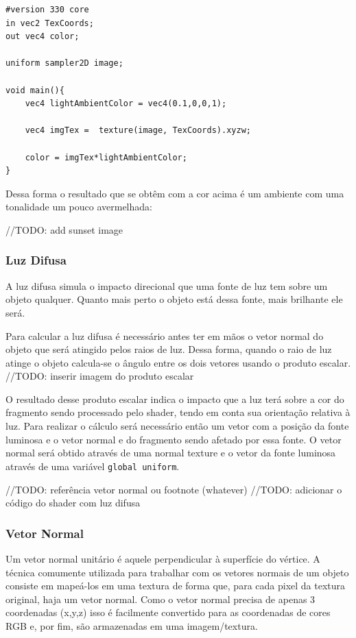 \documentclass[12pt, 
openright, 
oneside, 
a4paper,    
brazil]{facom-ufu-abntex2}
\begin{document}
\begin{lstlisting}[caption=Fragment Shader com luz ambiente]
#version 330 core
in vec2 TexCoords;
out vec4 color;

uniform sampler2D image;

void main(){
	vec4 lightAmbientColor = vec4(0.1,0,0,1);
	
	vec4 imgTex =  texture(image, TexCoords).xyzw;
	
	color = imgTex*lightAmbientColor;
}
\end{lstlisting}

Dessa forma o resultado que se obtêm com a cor acima é um ambiente com uma tonalidade um pouco avermelhada:

//TODO: add sunset image


\subsubsection{Luz Difusa}
A luz difusa simula o impacto direcional que uma fonte de luz tem sobre um objeto qualquer. Quanto mais perto o objeto está dessa fonte, mais brilhante ele será.

Para calcular a luz difusa é necessário antes ter em mãos o vetor normal do objeto que será atingido pelos raios de luz. Dessa forma, quando o raio de luz atinge o objeto calcula-se o ângulo entre os dois vetores usando o produto escalar.
//TODO: inserir imagem do produto escalar 

O resultado desse produto escalar indica o impacto que a luz terá sobre a cor do fragmento sendo processado pelo shader, tendo em conta sua orientação relativa à luz. Para realizar o cálculo será necessário  então um vetor com a posição da fonte luminosa e o vetor normal e do fragmento sendo afetado por essa fonte.
O vetor normal será obtido através de uma normal texture e o vetor da fonte luminosa através de uma variável \texttt{global uniform}.  

//TODO: referência vetor normal ou footnote (whatever)
//TODO: adicionar o código do shader com luz difusa

\subsubsection{Vetor Normal}

Um vetor normal unitário é aquele perpendicular à superfície do vértice. A técnica comumente utilizada para trabalhar com os vetores normais de um objeto consiste em mapeá-los em uma textura de forma que, para cada pixel da textura original, haja um vetor normal. Como o vetor normal precisa de apenas 3 coordenadas (x,y,z) isso é facilmente convertido para as coordenadas de cores RGB e, por fim, são armazenadas em uma imagem/textura.
\end{document}
